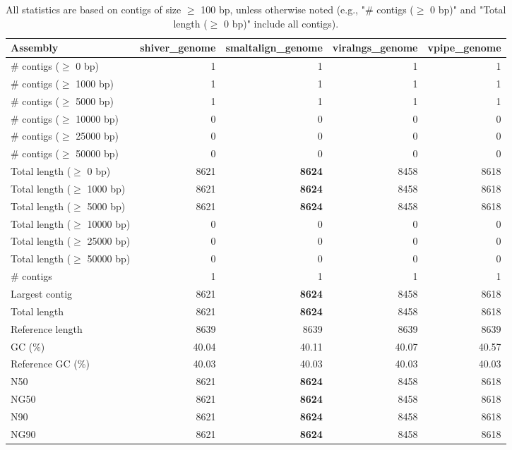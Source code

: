 \documentclass[12pt,a4paper]{article}
\begin{document}
\begin{table}[ht]
\begin{center}
\caption{All statistics are based on contigs of size $\geq$ 100 bp, unless otherwise noted (e.g., "\# contigs ($\geq$ 0 bp)" and "Total length ($\geq$ 0 bp)" include all contigs).}
\begin{tabular}{|l*{4}{|r}|}
\hline
Assembly & shiver\_genome & smaltalign\_genome & viralngs\_genome & vpipe\_genome \\ \hline
\# contigs ($\geq$ 0 bp) & 1 & 1 & 1 & 1 \\ \hline
\# contigs ($\geq$ 1000 bp) & 1 & 1 & 1 & 1 \\ \hline
\# contigs ($\geq$ 5000 bp) & 1 & 1 & 1 & 1 \\ \hline
\# contigs ($\geq$ 10000 bp) & 0 & 0 & 0 & 0 \\ \hline
\# contigs ($\geq$ 25000 bp) & 0 & 0 & 0 & 0 \\ \hline
\# contigs ($\geq$ 50000 bp) & 0 & 0 & 0 & 0 \\ \hline
Total length ($\geq$ 0 bp) & 8621 & {\bf 8624} & 8458 & 8618 \\ \hline
Total length ($\geq$ 1000 bp) & 8621 & {\bf 8624} & 8458 & 8618 \\ \hline
Total length ($\geq$ 5000 bp) & 8621 & {\bf 8624} & 8458 & 8618 \\ \hline
Total length ($\geq$ 10000 bp) & 0 & 0 & 0 & 0 \\ \hline
Total length ($\geq$ 25000 bp) & 0 & 0 & 0 & 0 \\ \hline
Total length ($\geq$ 50000 bp) & 0 & 0 & 0 & 0 \\ \hline
\# contigs & 1 & 1 & 1 & 1 \\ \hline
Largest contig & 8621 & {\bf 8624} & 8458 & 8618 \\ \hline
Total length & 8621 & {\bf 8624} & 8458 & 8618 \\ \hline
Reference length & 8639 & 8639 & 8639 & 8639 \\ \hline
GC (\%) & 40.04 & 40.11 & 40.07 & 40.57 \\ \hline
Reference GC (\%) & 40.03 & 40.03 & 40.03 & 40.03 \\ \hline
N50 & 8621 & {\bf 8624} & 8458 & 8618 \\ \hline
NG50 & 8621 & {\bf 8624} & 8458 & 8618 \\ \hline
N90 & 8621 & {\bf 8624} & 8458 & 8618 \\ \hline
NG90 & 8621 & {\bf 8624} & 8458 & 8618 \\ \hline

\end{tabular}
\end{center}
\end{table}
\end{document}
